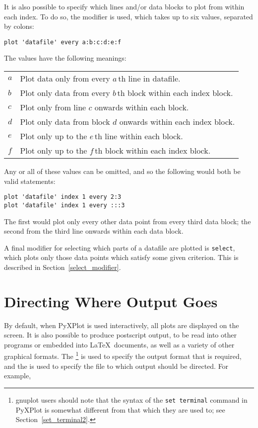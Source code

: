 It is also possible to specify which lines and/or data blocks to plot from
within each index. To do so, the  modifier is used, which takes
up to six values, separated by colons:\label{introduce_every}

\begin{verbatim}
plot 'datafile' every a:b:c:d:e:f
\end{verbatim}

The values have the following meanings:

\begin{longtable}{p{1.0cm}p{10.5cm}}
$a$ & Plot data only from every $a\,$th line in datafile. \\
$b$ & Plot only data from every $b\,$th block within each index block. \\
$c$ & Plot only from line $c$ onwards within each block. \\
$d$ & Plot only data from block $d$ onwards within each index block. \\
$e$ & Plot only up to the $e\,$th line within each block. \\
$f$ & Plot only up to the $f\,$th block within each index block. \\
\end{longtable}

\noindent Any or all of these values can be omitted, and so the following would
both be valid statements:

\begin{verbatim}
plot 'datafile' index 1 every 2:3
plot 'datafile' index 1 every :::3
\end{verbatim}

\noindent The first would plot only every other data point from every third
data block; the second from the third line onwards within each data block.

A final modifier for selecting which parts of a datafile are plotted is
{\tt select}, which plots only those data points which satisfy some given
criterion. This is described in Section~\ref{select_modifier}.

\section{Directing Where Output Goes}
\label{directing_output}

By default, when PyXPlot is used interactively, all plots are displayed on the
screen. It is also possible to produce postscript output, to be read into other
programs or embedded into \LaTeX\ documents, as well as a variety of other
graphical formats. The \footnote{gnuplot users should
note that the syntax of the {\tt set terminal} command in PyXPlot is
somewhat different from that which they are used to; see
Section~\ref{set_terminal2}.} is used to specify the output format that is
required, and the  is used to specify the file to which
output should be directed. For example,

